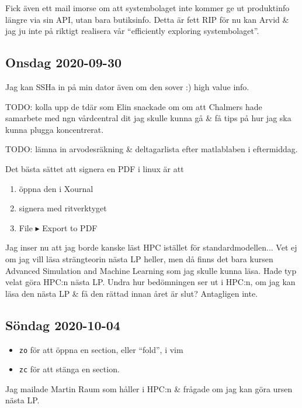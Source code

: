 \bigskip

Fick även ett mail imorse om att systembolaget inte kommer ge ut produktinfo längre via sin API, utan bara butiksinfo. Detta är fett RIP för nu kan Arvid \& jag ju inte på riktigt realisera vår \enquote{efficiently exploring systembolaget}.

\subsection{Onsdag 2020-09-30}

Jag kan SSHa in på min dator även om den sover :) high value info.

\bigskip

TODO: kolla upp de tdär som Elin snackade om om att Chalmers hade samarbete med ngn vårdcentral dit jag skulle kunna gå \& få tips på hur jag ska kunna plugga koncentrerat.

TODO: lämna in arvodesräkning \& deltagarlista efter matlablaben i eftermiddag. \checkmark

Det bästa sättet att signera en PDF i linux är att
\begin{enumerate}
	\item öppna den i Xournal
	\item signera med ritverktyget
	\item File $\blacktriangleright$ Export to PDF
\end{enumerate}

\bigskip

Jag inser nu att jag borde kanske läst HPC istället för standardmodellen... Vet ej om jag vill läsa strängteorin nästa LP heller, men då finns det bara kursen Advanced Simulation and Machine Learning som jag skulle kunna läsa. Hade typ velat göra HPC:n nästa LP. Undra hur bedömningen ser ut i HPC:n, om jag kan läsa den nästa LP \& få den rättad innan året är slut? Antagligen inte.


\subsection{Söndag 2020-10-04}

\begin{itemize}
	\item \verb|zo| för att öppna en section, eller \enquote{fold}, i vim
	\item \verb|zc| för att stänga en section.
\end{itemize}

Jag mailade Martin Raum som håller i HPC:n \& frågade om jag kan göra ursen nästa LP.



